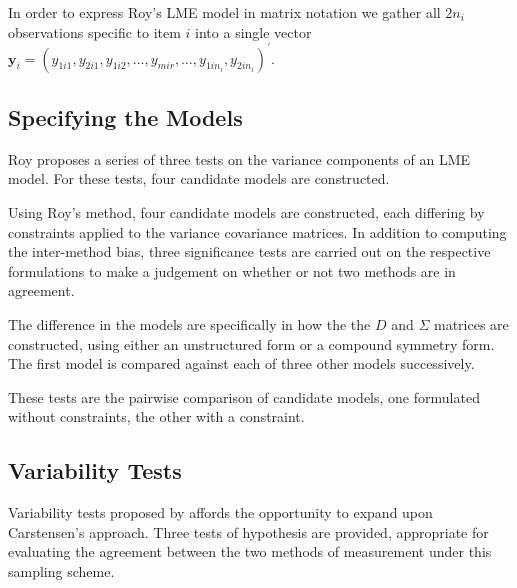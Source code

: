 \documentclass[12pt, a4paper]{report}
\theoremstyle{plain}
\theoremstyle{definition}
\theoremstyle{remark}
\begin{document}
	
	
	
	
	
	
	In order to express Roy's LME model in matrix notation we gather all $2n_i$ observations specific to item $i$ into a single vector  $\boldsymbol{y}_{i} = (y_{1i1},y_{2i1},y_{1i2},\ldots,y_{mir},\ldots,y_{1in_{i}},y_{2in_{i}})^\prime.$ 
	
	
	
	
	
	
	

	\subsection{Specifying the Models}
	Roy proposes a series of three tests on the variance components of an LME model. For these tests, four candidate models are constructed. 
	
	Using Roy's method, four candidate models are constructed, each differing by constraints applied to the variance covariance matrices. In addition to computing the inter-method bias, three significance tests are carried out on the respective formulations to make a judgement on whether or not two methods are in agreement.
	
	
	The difference in the models are specifically in how the the $D$ and $\Sigma$ matrices are constructed, using either an unstructured form or a compound symmetry form. The first model is compared against each of three other models successively.
	
	
	
	
	These tests are the pairwise comparison of candidate models, one formulated without constraints, the other with a constraint.
	
	
	
	
	
	

	\subsection{Variability Tests}
	
	
	

	
	Variability tests proposed by \citet{ARoy2009} affords the opportunity to expand upon Carstensen's approach. Three tests of hypothesis are provided, appropriate for evaluating the agreement between the two methods of measurement under this sampling scheme. 
	
\end{document}
